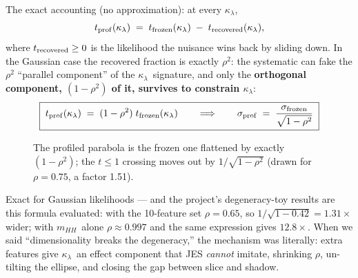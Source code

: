 \documentclass[11pt]{article}
\newcommand{\kl}{\ensuremath{\kappa_\lambda}}
\newcommand{\mhh}{\ensuremath{m_{HH}}}
\begin{document}
The exact accounting (no approximation): at every \kl,
\begin{equation}
t_{\rm prof}(\kl)\;=\;t_{\rm frozen}(\kl)\;-\;t_{\rm recovered}(\kl),
\end{equation}
where $t_{\rm recovered}\ge0$ is the likelihood the nuisance wins back by sliding down. In the Gaussian case
the recovered fraction is exactly $\rho^2$: the systematic can fake the $\rho^2$ ``parallel component'' of the
\kl\ signature, and only the \textbf{orthogonal component, $(1-\rho^2)$ of it, survives to constrain \kl}:
\begin{equation}
\boxed{\;t_{\rm prof}(\kl)\;=\;(1-\rho^2)\;t_{\rm frozen}(\kl)
\qquad\Longrightarrow\qquad
\sigma_{\rm prof}\;=\;\frac{\sigma_{\rm frozen}}{\sqrt{1-\rho^2}}\;}
\end{equation}

\begin{figure}[htbp]\centering
{}
\caption{The profiled parabola is the frozen one flattened by exactly $(1-\rho^2)$; the $t\le1$ crossing moves
out by $1/\sqrt{1-\rho^2}$ (drawn for $\rho=0.75$, a factor 1.51).}
\label{fig:parab}
\end{figure}

\begin{takeaway}
Exact for Gaussian likelihoods --- and the project's degeneracy-toy results are this formula evaluated: with the
10-feature set $\rho=0.65$, so $1/\sqrt{1-0.42}=1.31\times$ wider; with \mhh\ alone $\rho\approx0.997$ and the
same expression gives $12.8\times$. When we said ``dimensionality breaks the degeneracy,'' the mechanism was
literally: extra features give \kl\ an effect component that JES \emph{cannot} imitate, shrinking $\rho$,
un-tilting the ellipse, and closing the gap between slice and shadow.
\end{takeaway}
\end{document}
